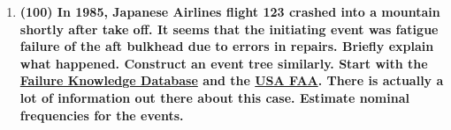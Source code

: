 \documentclass[11pt,a4paper]{article}
\begin{document}
\begin{enumerate}[leftmargin=*,topsep=0pt,font=\bfseries]
        
        
        
        
        
        
        
        
        
        
        
        
        
        
        
        
        
        
        
        
        
        
        \newpage
    \item\textbf{(100) In 1985, Japanese Airlines flight 123 crashed into a mountain shortly after take off. It seems that the initiating event was fatigue failure of the aft bulkhead due to errors in repairs. Briefly explain what happened. Construct an event tree similarly. Start with the \href{http://www.shippai.org/fkd/en/cfen/CB1071008.html}{Failure Knowledge Database} and the \href{https://lessonslearned.faa.gov/ll_adsearch_results.cfm?TabID=5}{USA FAA}. There is actually a lot of information out there about this case. Estimate nominal frequencies for the events.}
        \vspace{\baselineskip}
        
        
        
        
        
        
        
        
        
        
        
        
        
        
        
        
        
        
        
        
        
        
        
        
        
        
        
        
        
        
        
        
        
        
        

\end{enumerate}
\end{document}
